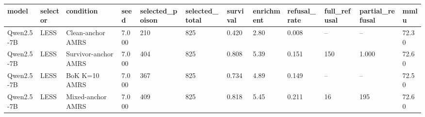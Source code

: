 \begin{tabular}{llllllllllll}
\toprule
model & selector & condition & seed & selected\_poison & selected\_total & survival & enrichment & refusal\_rate & full\_refusal & partial\_refusal & mmlu \\
\midrule
Qwen2.5-7B & LESS & Clean-anchor AMRS & 7.000 & 210 & 825 & 0.420 & 2.80 & 0.008 & -- & -- & 72.30 \\
Qwen2.5-7B & LESS & Survivor-anchor AMRS & 7.000 & 404 & 825 & 0.808 & 5.39 & 0.151 & 150 & 1.000 & 72.60 \\
Qwen2.5-7B & LESS & BoK K=10 AMRS & 7.000 & 367 & 825 & 0.734 & 4.89 & 0.149 & -- & -- & 72.50 \\
Qwen2.5-7B & LESS & Mixed-anchor AMRS & 7.000 & 409 & 825 & 0.818 & 5.45 & 0.211 & 16 & 195 & 72.60 \\
\bottomrule
\end{tabular}
